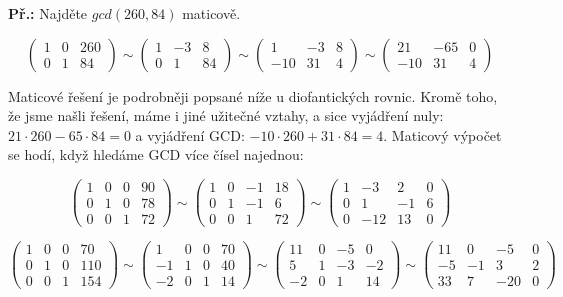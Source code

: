 \begin{exercise}
\textbf{Př.:} Najděte $gcd(260, 84)$ maticově.

\[ \left( \begin{array}{cc|c}
1 & 0 & 260\\
0 & 1 & 84 \end{array} \right)
%
\sim
%
\left( \begin{array}{cc|c}
1 & -3 & 8\\
0 & 1 & 84 \end{array} \right)
%
\sim
%
\left( \begin{array}{cc|c}
1 & -3 & 8\\
-10 & 31 & 4 \end{array} \right)
%
\sim
%
\left( \begin{array}{cc|c}
21 & -65 & 0\\
-10 & 31 & 4 \end{array} \right) \]

Maticové řešení je podrobněji popsané níže u diofantických rovnic. Kromě toho,
že jsme našli řešení, máme i jiné užitečné vztahy, a sice vyjádření nuly: $21
\cdot 260 - 65 \cdot 84 = 0$ a vyjádření GCD: $-10 \cdot 260 + 31 \cdot 84 = 4$.
Maticový výpočet se hodí, když hledáme GCD více čísel najednou:

\[ \left( \begin{array}{ccc|c}
1 & 0 & 0 & 90\\
0 & 1 & 0 &  78\\
0 & 0 & 1 &  72 \end{array} \right)
%
\sim
%
\left( \begin{array}{ccc|c}
1 & 0 & -1 & 18\\
0 & 1 & -1 &  6\\
0 & 0 & 1 &  72 \end{array} \right)
%
\sim
%
\left( \begin{array}{ccc|c}
1 & -3 & 2 & 0\\
0 & 1 & -1 &  6\\
0 & -12 & 13 &  0 \end{array} \right) \]

\[ \left( \begin{array}{ccc|c}
1 & 0 & 0 & 70\\
0 & 1 & 0 &  110\\
0 & 0 & 1 &  154 \end{array} \right)
%
\sim
%
\left( \begin{array}{ccc|c}
1 & 0 & 0 & 70\\
-1 & 1 & 0 &  40\\
-2 & 0 & 1 &  14 \end{array} \right)
%
\sim
%
\left( \begin{array}{ccc|c}
11 & 0 & -5 & 0\\
5 & 1 & -3 &  -2\\
-2 & 0 & 1 &  14 \end{array} \right)
%
\sim
%
\left( \begin{array}{ccc|c}
11 & 0 & -5 & 0\\
-5 & -1 & 3 &  2\\
33 & 7 & -20 &  0 \end{array} \right) \]
\end{exercise}

